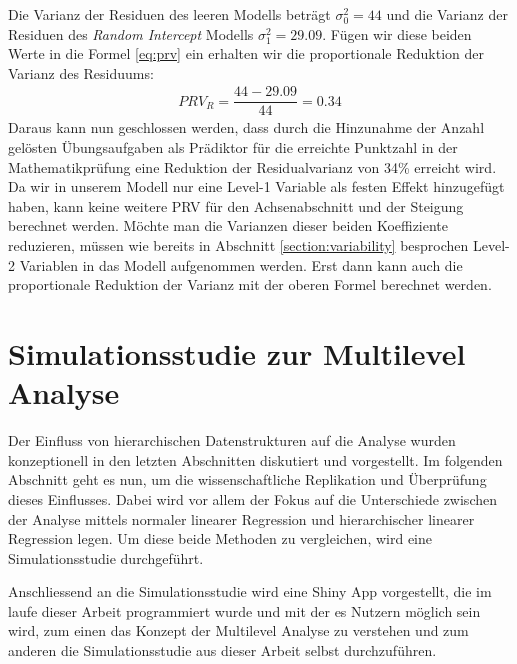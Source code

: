 \documentclass[12pt]{article}\usepackage[]{graphicx}\usepackage[]{color}
\begin{document}

Die Varianz der Residuen des leeren Modells beträgt $\sigma_{0}^2 = 44$ und die Varianz der Residuen des \textit{Random Intercept} Modells $\sigma_{1}^2 = 29.09$. Fügen wir diese beiden Werte in die Formel \eqref{eq:prv} ein erhalten wir die proportionale Reduktion der Varianz des Residuums:
\begin{equation} 
\begin{split}	
 PRV_{R} = \dfrac{44 - 29.09}{44} = 0.34
\end{split}	
\end{equation}
Daraus kann nun geschlossen werden, dass durch die Hinzunahme der Anzahl gelösten Übungsaufgaben als Prädiktor für die erreichte Punktzahl in der Mathematikprüfung eine Reduktion der Residualvarianz von 34\% erreicht wird. Da wir in unserem Modell nur eine Level-1 Variable als festen Effekt hinzugefügt haben, kann keine weitere PRV für den Achsenabschnitt und der Steigung berechnet werden. Möchte man die Varianzen dieser beiden Koeffiziente reduzieren, müssen wie bereits in Abschnitt \ref{section:variability} besprochen Level-2 Variablen in das Modell aufgenommen werden. Erst dann kann auch die proportionale Reduktion der Varianz mit der oberen Formel berechnet werden.

\section{Simulationsstudie zur Multilevel Analyse}
Der Einfluss von hierarchischen Datenstrukturen auf die Analyse wurden konzeptionell in den letzten Abschnitten diskutiert und vorgestellt. Im folgenden Abschnitt geht es nun, um die wissenschaftliche Replikation und Überprüfung dieses Einflusses. Dabei wird vor allem der Fokus auf die Unterschiede zwischen der Analyse mittels normaler linearer Regression und hierarchischer linearer Regression legen. Um diese beide Methoden zu vergleichen, wird eine Simulationsstudie durchgeführt.

Anschliessend an die Simulationsstudie wird eine Shiny App \citep{shiny} vorgestellt, die im laufe dieser Arbeit programmiert wurde und mit der es Nutzern möglich sein wird, zum einen das Konzept der Multilevel Analyse zu verstehen und zum anderen die Simulationsstudie aus dieser Arbeit selbst durchzuführen.
\end{document}
